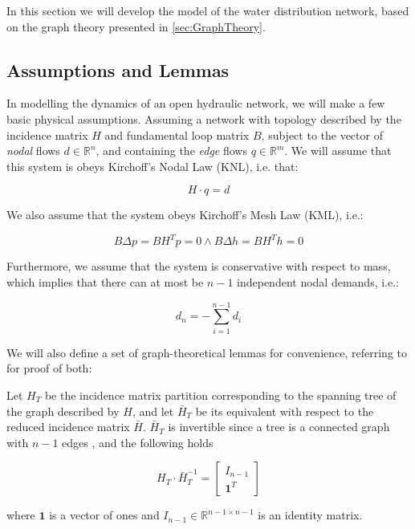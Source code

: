 In this section we will develop the model of the water distribution network, based on the graph theory presented in \cref{sec:GraphTheory}.

\subsection{Assumptions and Lemmas}\label{subsec:AsssumAndLemmas}

In modelling the dynamics of an open hydraulic network, we will make a few basic physical assumptions. Assuming a network with topology described by the incidence matrix $H$ and fundamental loop matrix $B$, subject to the vector of \textit{nodal} flows $d \in \mathbb{R}^n$, and containing the \textit{edge} flows $q \in \mathbb{R}^m$. We will assume that this system is obeys Kirchoff's Nodal Law (KNL), i.e. that:

\begin{equation}\label{eq:KirchNodeLaw}
	H\cdot q = d
\end{equation} 

We also assume that the system obeys Kirchoff's Mesh Law (KML), i.e.:

\begin{equation}\label{eq:KirchMeshLaw}
	B\Delta p = B H^T p = 0 \wedge B\Delta h = B H^T h = 0
\end{equation}

Furthermore, we assume that the system is conservative with respect to mass, which implies that there can at most be $n-1$ independent nodal demands, i.e.:

\begin{equation}\label{eq:MassConservation}
	d_n = -\sum_{i=1}^{n-1}d_i
\end{equation}

We will also define a set of graph-theoretical lemmas for convenience, referring to \cite{Jensen} for proof of both:

\begin{lemma}\label{lem:TreePartitionLemma}
	Let $H_T$ be the incidence matrix partition corresponding to the spanning tree of the graph described by $H$, and let $\bar{H}_T$ be its equivalent with respect to the reduced incidence matrix $\bar{H}$. $\bar{H}_T$ is invertible since a tree is a connected graph with $n-1$ edges \cite{Deo}, and the following holds
	
	\begin{equation}\label{eq:TreePartitionLemma}
		H_T\cdot\bar{H}_T^{-1} = \begin{bmatrix} I_{n-1} \\ \mathbf{1}^T	\end{bmatrix}
	\end{equation}

where $\mathbf{1}$ is a vector of ones and $I_{n-1} \in \mathbb{R}^{n-1 \times n-1}$ is an identity matrix.
\end{lemma}

